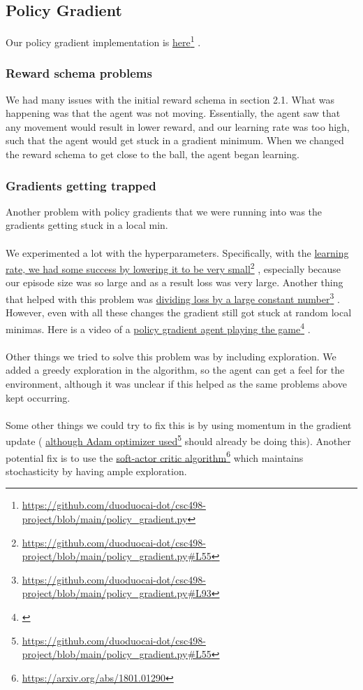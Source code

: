 \documentclass[twoside,11pt]{article}
\newcommand\fnurl[2]{%
  \href{#2}{#1}\footnote{\url{#2}}%
}
\begin{document}
\subsection{Policy Gradient}
Our policy gradient implementation is \fnurl{here}{https://github.com/duoduocai-dot/csc498-project/blob/main/policy_gradient.py}. 
\subsubsection{Reward schema problems}
We had many issues with the initial reward schema in section 2.1. What was happening was that the agent was not moving. Essentially, the agent saw that any movement would result in lower reward, and  our learning rate was too high, such that the agent would get stuck in a gradient minimum. When we changed the reward schema to get close to the ball, the agent began learning.
\subsubsection{Gradients getting trapped}
Another problem with policy gradients that we were running into was the gradients getting stuck in a local min. 
\\\\We experimented a lot with the hyperparameters. Specifically, with the \fnurl{learning rate, we had some success by lowering it to be very small}{https://github.com/duoduocai-dot/csc498-project/blob/main/policy_gradient.py\#L55}, especially because our episode size was so large and as a result loss was very large. Another thing that helped with this problem was \fnurl{dividing loss by a large constant number}{https://github.com/duoduocai-dot/csc498-project/blob/main/policy_gradient.py\#L93}. However, even with all these changes the gradient still got stuck at random local minimas. Here is a video of a \fnurl{policy gradient agent playing the game}{}.
\\\\
Other things we tried to solve this problem was by including exploration. We added a greedy exploration in the algorithm, so the agent can get a feel for the environment, although it was unclear if this helped as the same problems above kept occurring. 
\\\\
Some other things we could try to fix this is by using momentum in the gradient update (\fnurl{although Adam optimizer used}{https://github.com/duoduocai-dot/csc498-project/blob/main/policy_gradient.py\#L55} should already be doing this). Another potential fix is to use the \fnurl{soft-actor critic algorithm}{https://arxiv.org/abs/1801.01290} which maintains stochasticity by having ample exploration. 
\end{document}

